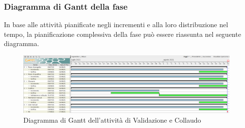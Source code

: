 \pagebreak
\subsubsection{Diagramma di Gantt della fase}
In base alle attività pianificate negli incrementi e alla loro distribuzione nel tempo, la pianificazione complessiva della fase può essere riassunta nel seguente diagramma.
\begin{figure}[!ht]
    \caption{Diagramma di Gantt dell'attività di Validazione e Collaudo}
    \vspace{5px}
    \includegraphics[scale=0.25]{../../../Images/Diagrammi/Gantt/validazione_v3.png}
    \centering
\end{figure}